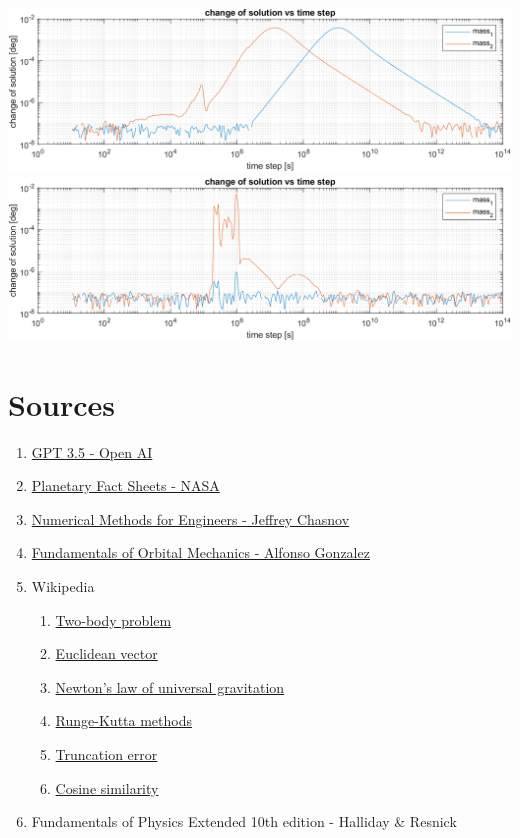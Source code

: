 \documentclass[english,12pt,a4paper, notitlepage]{report}
\begin{document}
	
	\newpage
	
	\includegraphics[angle=90, height=\textheight]{euler_err.png}
	\includegraphics[angle=90, height=\textheight]{RK4_err.png}
	
	\chapter{Sources}
	\begin{enumerate}
		\item \href{https://openai.com/chatgpt}{GPT 3.5 - Open AI}
		\item \href{https://nssdc.gsfc.nasa.gov/planetary/planetfact.html}{Planetary Fact Sheets - NASA}
		\item \href{https://www.youtube.com/playlist?list=PLkZjai-2Jcxn35XnijUtqqEg0Wi5Sn8ab}{Numerical Methods for Engineers - Jeffrey Chasnov}
		\item \href{https://www.youtube.com/playlist?list=PLOIRBaljOV8hBJS4m6brpmUrncqkyXBjB}{Fundamentals of Orbital Mechanics - Alfonso Gonzalez}
		\item Wikipedia
		\begin{enumerate}
			\item \href{https://en.wikipedia.org/wiki/Two-body_problem}{Two-body problem}
			\item \href{https://en.wikipedia.org/wiki/Euclidean_vector#Dot_product}{Euclidean vector}
			\item \href{https://en.wikipedia.org/wiki/Newton%27s_law_of_universal_gravitation}{Newton's law of universal gravitation}
			\item \href{https://en.wikipedia.org/wiki/Runge%E2%80%93Kutta_methods}{Runge-Kutta methods}
			\item \href{https://en.wikipedia.org/wiki/Truncation_error_(numerical_integration)}{Truncation error}
			\item \href{https://en.wikipedia.org/wiki/Cosine_similarity}{Cosine similarity}
		\end{enumerate}
		\item Fundamentals of Physics Extended 10th edition - Halliday \& Resnick
	\end{enumerate}
	
\end{document}
